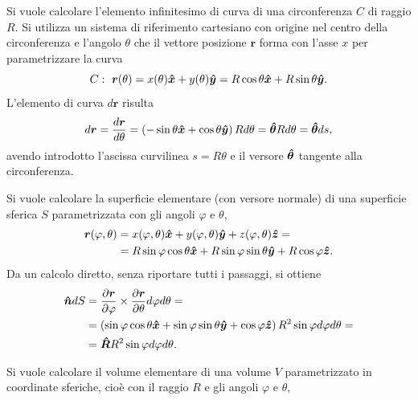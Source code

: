 \begin{remark}
\begin{example}\label{exa:pol:line}
Si vuole calcolare l'elemento infinitesimo di curva di una circonferenza $C$ di raggio $R$. Si utilizza un sistema di riferimento cartesiano con origine nel centro della circonferenza e l'angolo $\theta$ che il vettore posizione $\bm{r}$ forma con l'asse $x$ per parametrizzare la curva
\begin{equation}
  C : \ \bm{r}(\theta) = x(\theta) \bh{x} + y(\theta) \bh{y} = R \cos \theta \bh{x} + R \sin \theta \bh{y} .
\end{equation}
L'elemento di curva $d \bm{r}$ risulta
\begin{equation}
 d\bm{r} = \dfrac{d\bm{r}}{d \theta} = \left( -\sin \theta \bm{\hat{x}} + \cos \theta \bm{\hat{y}} \right) R d \theta = \bm{\hat{\theta}} R d\theta = \bm{\hat{\theta}} ds ,
\end{equation}
avendo introdotto l'ascissa curvilinea $s = R \theta$ e il versore $\bm{\hat{\theta}}$ tangente alla circonferenza.
\end{example}
\begin{example}\label{exa:cyl:surf}
Si vuole calcolare la superficie elementare (con versore normale) di una superficie sferica $S$ parametrizzata con gli angoli $\varphi$ e $\theta$,
\begin{equation}
\begin{aligned}
 \bm{r}(\varphi,\theta) & = 
 x(\varphi,\theta) \bm{\hat{x}} + y(\varphi,\theta) \bm{\hat{y}} + z(\varphi,\theta) \bm{\hat{z}} = \\
& = R \sin \varphi \cos \theta \bm{\hat{x}} +
    R \sin \varphi \sin \theta \bm{\hat{y}} +
    R \cos \varphi \bm{\hat{z}} .
\end{aligned}
\end{equation}
Da un calcolo diretto, senza riportare tutti i passaggi, si ottiene
\begin{equation}
\begin{aligned}
 \bm{\hat{n}} dS & = \dfrac{\partial \bm{r}}{\partial \varphi} \times \dfrac{\partial \bm{r}}{\partial \theta} d\varphi d\theta = \\
 & = \left( \sin \varphi \cos \theta \bm{\hat{x}} + \sin \varphi \sin \theta \bm{\hat{y}} + \cos \varphi \bm{\hat{z}} \right) R^2 \sin \varphi d \varphi d \theta = \\
 & = \bm{\hat{R}} R^2 \sin \varphi d \varphi d \theta .
\end{aligned}
\end{equation}
\end{example}
\begin{example}\label{exa:cyl:vol}
Si vuole calcolare il volume elementare di una volume $V$ parametrizzato in coordinate sferiche, cioè con il raggio $R$ e gli angoli $\varphi$ e $\theta$,

\end{example}
\end{remark}
